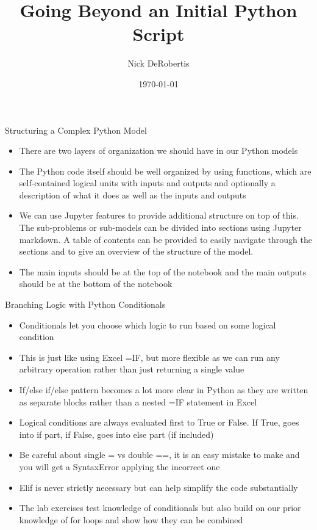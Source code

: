 \documentclass[]{article}
\begin{document}
\title{Going Beyond an Initial Python Script}
\author{Nick DeRobertis}
\date{\today}
\maketitle
\begin{section}{Structuring a Complex Python Model}
\begin{itemize}
\item There are two layers of organization we should have in our Python models
\item The Python code itself should be well organized by using functions, which are self-contained logical units with inputs and outputs and optionally a description of what it does as well as the inputs and outputs
\item We can use Jupyter features to provide additional structure on top of this. The sub-problems or sub-models can be divided into sections using Jupyter markdown. A table of contents can be provided to easily navigate through the sections and to give an overview of the structure of the model.
\item The main inputs should be at the top of the notebook and the main outputs should be at the bottom of the notebook
\end{itemize}
\end{section}
\begin{section}{Branching Logic with Python Conditionals}
\begin{itemize}
\item Conditionals let you choose which logic to run based on some logical condition
\item This is just like using Excel =IF, but more flexible as we can run any arbitrary operation rather than just returning a single value
\item If/else if/else pattern becomes a lot more clear in Python as they are written as separate blocks rather than a nested =IF statement in Excel
\item Logical conditions are always evaluated first to True or False. If True, goes into if part, if False, goes into else part (if included)
\item Be careful about single = vs double ==, it is an easy mistake to make and you will get a SyntaxError applying the incorrect one
\item Elif is never strictly necessary but can help simplify the code substantially
\item The lab exercises test knowledge of conditionals but also build on our prior knowledge of for loops and show how they can be combined
\end{itemize}
\end{section}
\end{document}
